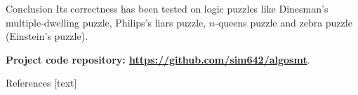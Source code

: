 \documentclass{beamer}
\begin{document}
\begin{frame}[fragile,t]
\begin{columns}[t,onlytextwidth]
\begin{column}{0.485\textwidth}
\begin{block}{Conclusion}
			Its correctness has been tested on logic puzzles like Dinesman's multiple-dwelling puzzle, Philips's liars puzzle, $n$-queens puzzle and zebra puzzle (Einstein's puzzle).

			\textbf{Project code repository: \url{https://github.com/sim642/algosmt}}.
		\end{block}
	
		\begin{block}{References}
			[text]
			\printbibliography[heading=none]
		\end{block}
	\end{column}
\end{columns}

%

\end{frame}
\end{document}
